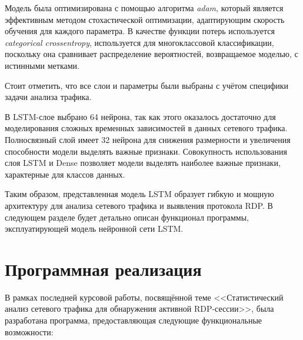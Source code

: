 \documentclass[bachelor, och, coursework]{SCWorks}
\begin{document}
Модель была оптимизирована с помощью алгоритма \textit{adam}, который является эффективным методом стохастической оптимизации, адаптирующим скорость 
обучения для каждого параметра. В качестве функции потерь используется \textit{categorical crossentropy}, используется для многоклассовой классификации, 
поскольку она сравнивает распределение вероятностей, возвращаемое моделью, с истинными метками.

Стоит отметить, что все слои и параметры были выбраны с учётом специфики задачи анализа трафика.

В LSTM-слое выбрано 64 нейрона, так как этого оказалось достаточно для моделирования сложных временных зависимостей в данных сетевого трафика. Полносвязный 
слой имеет 32 нейрона для снижения размерности и увеличения способности модели выделять важные признаки. Совокупность использования слоя LSTM и Dense 
позволяет модели выделять наиболее важные признаки, характерные для классов данных.

Таким образом, представленная модель LSTM образует гибкую и мощную архитектуру для анализа сетевого трафика и выявления протокола RDP. В следующем 
разделе будет детально описан функционал программы, эксплуатирующей модель нейронной сети LSTM. 
  

\section{Программная реализация}

В рамках последней курсовой работы, посвящённой теме <<Статистический анализ сетевого трафика для обнаружения активной RDP-сессии>>, была разработана 
программа, предоставляющая следующие функциональные возможности:
\end{document}
